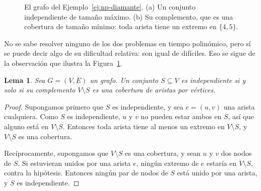 \documentclass[12pt, spanish, oneside, openany]{book}
\theoremstyle{uprightplain}
\newtheorem{lema}[teorema]{Lema}
\theoremstyle{definition}
\theoremstyle{remark}
\theoremstyle{definition}
\begin{document}
\begin{figure}[H]
\centering
{}
\caption{El grafo del Ejemplo~\ref{ej:np-diamante}. (a) Un conjunto independiente
de tamaño máximo. (b) Su complemento, que es una cobertura de tamaño mínimo:
toda arista tiene un extremo en $\{4,5\}$.}
\label{fig:np-is-vc}
\end{figure}

No se sabe resolver ninguno de los dos problemas en tiempo polinómico, pero sí se puede decir algo de su dificultad relativa: son igual de difíciles. Eso se sigue de la observación que ilustra la Figura~\ref{fig:np-is-vc}.

\begin{lema}
\label{lema:np-complemento}
Sea $G=(V,E)$ un grafo. Un conjunto $S\subseteq V$ es independiente si y solo si su complemento $V\setminus S$ es una cobertura de aristas por vértices.
\end{lema}
\begin{proof}
Supongamos primero que $S$ es independiente, y sea $e=(u,v)$ una arista cualquiera. Como $S$ es independiente, $u$ y $v$ no pueden estar ambos en $S$, así que alguno está en $V\setminus S$. Entonces toda arista tiene al menos un extremo en $V\setminus S$, y $V\setminus S$ es una cobertura.

Recíprocamente, supongamos que $V\setminus S$ es una cobertura, y sean $u$ y $v$ dos nodos de $S$. Si estuvieran unidos por una arista $e$, ningún extremo de $e$ estaría en $V\setminus S$, contra la hipótesis. Entonces ningún par de nodos de $S$ está unido por una arista, y $S$ es independiente.
\end{proof}
\end{document}

